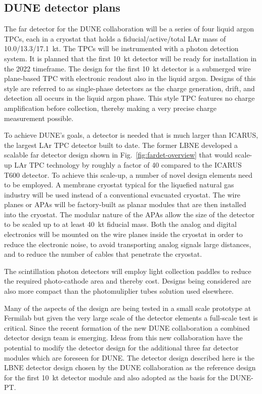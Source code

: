 \label{singlephasedet}

\subsection{DUNE detector plans}

The far detector for the DUNE collaboration will be a series of four liquid argon TPCs, each in a cryostat that holds a fiducial/active/total LAr mass of 10.0/13.3/17.1~kt. The TPCs will be instrumented with a photon detection system. It is planned that the first 10~kt detector will be ready for installation in the 2022 timeframe. 
The design for the first 10~kt detector is a submerged wire plane-based TPC with electronic readout also in the liquid argon.  Designs of this style are referred to as single-phase detectors as the charge generation, drift, and detection all occurs in the liquid argon phase.  This style TPC features no charge amplification before collection, thereby making a very precise charge measurement possible. 


To achieve DUNE's goals, a detector is needed that is much larger than ICARUS, the largest LAr TPC detector built to date. The former LBNE developed a scalable far detector design shown in Fig.~\ref{fig:fardet-overview} that would scale-up LAr TPC technology by roughly a factor of 40 compared to the ICARUS T600 detector. To achieve this scale-up, a number of novel design elements need to be employed. A membrane cryostat typical for the liquefied natural gas industry will be used instead of a conventional evacuated cryostat.  The wire planes or APAs will be factory-built as planar modules that are then installed into the cryostat. The modular nature of the APAs allow the size of the detector to be scaled up to at least 40~kt fiducial mass. Both the analog and digital electronics will be mounted on the wire planes inside the cryostat in order to reduce the electronic noise, to avoid transporting analog signals large distances, and to reduce the number of cables that penetrate the cryostat. 

The scintillation photon detectors will employ light collection paddles to reduce the required photo-cathode area and thereby cost.  Designs being considered are also more compact than the photomuliplier tubes solution used elsewhere.

Many of the aspects of the design are being tested in a small scale prototype at Fermilab but given the very large scale of the detector elements a full-scale test is critical. 
Since the recent formation of the new DUNE collaboration a combined detector design team is emerging. 
Ideas from this new collaboration have the potential to modify the detector design for the additional three far detector modules
which are foreseen for DUNE.
The detector design described here is the LBNE detector design chosen by the DUNE collaboration as the reference design for the first 10~kt 
detector module and also adopted as the basis for the DUNE-PT.



